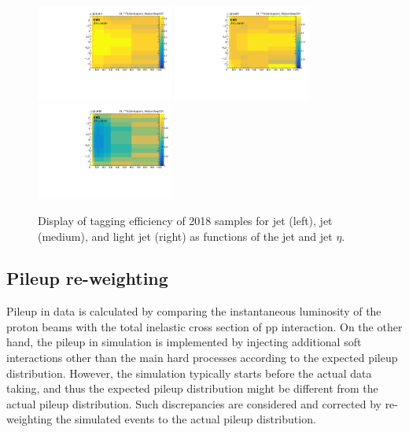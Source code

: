 \begin{figure}\centering
    \includegraphics[width=0.4\textwidth]{figure/BtagEffPlot_18_TTToSemiLeptonic_eff2D_b_MediumDeepCSV.pdf}
    \includegraphics[width=0.4\textwidth]{figure/BtagEffPlot_18_TTToSemiLeptonic_eff2D_c_MediumDeepCSV.pdf}
    \includegraphics[width=0.4\textwidth]{figure/BtagEffPlot_18_TTToSemiLeptonic_eff2D_l_MediumDeepCSV.pdf}
    \caption[Display of \PQb tagging efficiency of 2018 \ttbar samples.]
    {
        Display of \PQb tagging efficiency of 2018 \ttbar samples for \PQb jet (left), \PQc jet (medium), and light jet (right) as functions of the jet \PT and jet $\eta$.
    }
    \label{fig:reco_beff18}
\end{figure}

\subsection{Pileup re-weighting}
Pileup in data is calculated by comparing the instantaneous luminosity of the proton beams with the total inelastic cross section of pp interaction.
On the other hand, the pileup in simulation is implemented by injecting additional soft interactions other than the main hard processes according to the expected pileup distribution.
However, the simulation typically starts before the actual data taking, and thus the expected pileup distribution might be different from the actual pileup distribution.
Such discrepancies are considered and corrected by re-weighting the simulated events to the actual pileup distribution.

